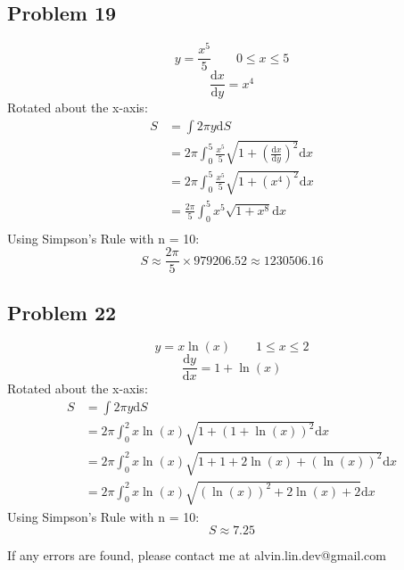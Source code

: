 \documentclass[letterpaper, 12pt]{article}
\newcommand*{\diff}{\mathrm{d}}
\begin{document}
\subsection*{Problem 19}
\[ y = \frac{x^{5}}{5} \quad \quad 0 \leq x \leq 5 \]
\[ \frac{\diff{x}}{\diff{y}} = x^{4} \]
Rotated about the x-axis:
\begin{align*}
  S &= \int{2\pi y\diff{S}} \\
  &= 2\pi\int_{0}^{5}{
    \frac{x^{5}}{5}\sqrt{1+(\frac{\diff{x}}{\diff{y}})^{2}}\diff{x}} \\
  &= 2\pi\int_{0}^{5}{\frac{x^{5}}{5}\sqrt{1+(x^{4})^{2}}\diff{x}} \\
  &= \frac{2\pi}{5}\int_{0}^{5}{x^{5}\sqrt{1+x^{8}}\diff{x}} \\
\end{align*}
Using Simpson's Rule with n = 10:
\[ S \approx \frac{2\pi}{5} \times 979206.52 \approx 1230506.16 \]

\subsection*{Problem 22}
\[ y = x\ln(x) \quad \quad 1 \leq x \leq 2 \]
\[ \frac{\diff{y}}{\diff{x}} = 1+\ln(x) \]
Rotated about the x-axis:
\begin{align*}
  S &= \int{2\pi y\diff{S}} \\
  &= 2\pi\int_{0}^{2}{x\ln(x)\sqrt{1+(1+\ln(x))^{2}}\diff{x}} \\
  &= 2\pi\int_{0}^{2}{x\ln(x)\sqrt{1+1+2\ln(x)+(\ln(x))^{2}}\diff{x}} \\
  &= 2\pi\int_{0}^{2}{x\ln(x)\sqrt{(\ln(x))^{2}+2\ln(x)+2}\diff{x}}
\end{align*}
Using Simpson's Rule with n = 10:
\[ S \approx 7.25 \]

\begin{center}
  If any errors are found, please contact me at alvin.lin.dev@gmail.com
\end{center}
\end{document}
